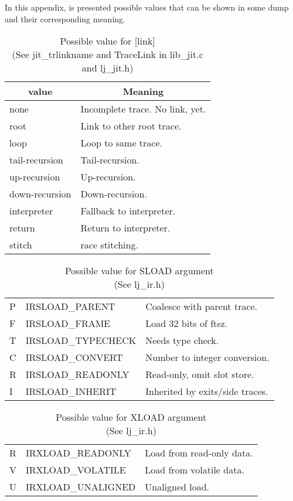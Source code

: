 
In this appendix, is presented possible values that can be shown in some dump
and their corresponding meaning.
\begin{table}
\centering
\begin{tabular}{|l|l|}
\hline
\multicolumn{1}{|c|}{value} & \multicolumn{1}{c|}{Meaning}\\\hline
none                        & Incomplete trace. No link, yet.\\
root                        & Link to other root trace.\\
loop                        & Loop to same trace.\\
tail-recursion              & Tail-recursion.\\
up-recursion                & Up-recursion.\\
down-recursion              & Down-recursion.\\
interpreter                 & Fallback to interpreter.\\
return                      & Return to interpreter.\\
stitch                      & race stitching.\\\hline
\end{tabular}
\caption{
  Possible value for [link] \\(See jit\_trlinkname and TraceLink in lib\_jit.c
  and lj\_jit.h)
}
\label{tab:dump-link}
\end{table}
\begin{table}
\centering
\begin{tabular}{|l|l|l|}
\hline
P & IRSLOAD\_PARENT    & Coalesce with parent trace.\\
F & IRSLOAD\_FRAME     & Load 32 bits of ftsz.\\
T & IRSLOAD\_TYPECHECK & Needs type check.\\
C & IRSLOAD\_CONVERT   & Number to integer conversion.\\
R & IRSLOAD\_READONLY  & Read-only, omit slot store.\\
I & IRSLOAD\_INHERIT   & Inherited by exits/side traces.\\
\hline
\end{tabular}
\caption{
  Possible value for SLOAD argument \\(See lj\_ir.h)
}
\label{tab:dump-sload}
\end{table}
\begin{table}
\centering
\begin{tabular}{|l|l|l|}
\hline
R & IRXLOAD\_READONLY  & Load from read-only data.\\
V & IRXLOAD\_VOLATILE  & Load from volatile data.\\
U & IRXLOAD\_UNALIGNED & Unaligned load.\\
\hline
\end{tabular}
\caption{
  Possible value for XLOAD argument \\(See lj\_ir.h)
}
\label{tab:dump-sload}
\end{table}
